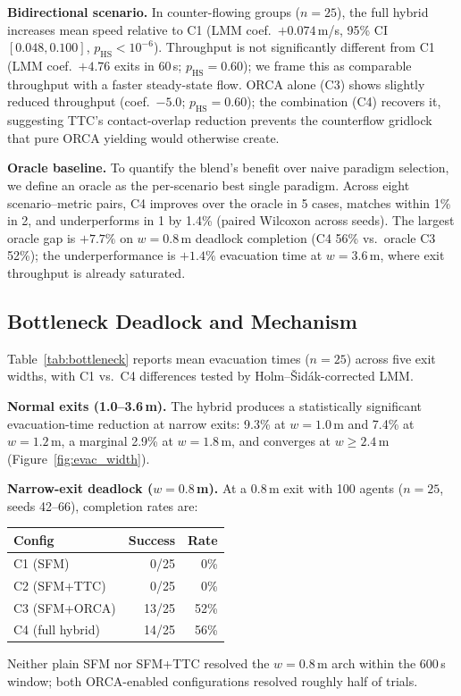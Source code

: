 \documentclass[a4paper,twoside]{article}
\begin{document}
\textbf{Bidirectional scenario.}
In counter-flowing groups ($n=25$), the full hybrid increases mean speed relative to C1 (LMM coef.\ $+0.074$\,m/s, 95\% CI $[0.048,0.100]$, $p_{\mathrm{HS}}<10^{-6}$). Throughput is not significantly different from C1 (LMM coef.\ $+4.76$ exits in 60\,s; $p_{\mathrm{HS}}=0.60$); we frame this as comparable throughput with a faster steady-state flow. ORCA alone (C3) shows slightly reduced throughput (coef.\ $-5.0$; $p_{\mathrm{HS}}=0.60$); the combination (C4) recovers it, suggesting TTC's contact-overlap reduction prevents the counterflow gridlock that pure ORCA yielding would otherwise create.

\textbf{Oracle baseline.}
To quantify the blend's benefit over naive paradigm selection, we define an oracle as the per-scenario best single paradigm. Across eight scenario--metric pairs, C4 improves over the oracle in 5 cases, matches within 1\% in 2, and underperforms in 1 by 1.4\% (paired Wilcoxon across seeds). The largest oracle gap is $+7.7\%$ on $w=0.8$\,m deadlock completion (C4 56\% vs.\ oracle C3 52\%); the underperformance is $+1.4\%$ evacuation time at $w=3.6$\,m, where exit throughput is already saturated.

\subsection{Bottleneck Deadlock and Mechanism}
\label{sec:bottleneck-evac}

Table~\ref{tab:bottleneck} reports mean evacuation times ($n=25$) across five exit widths, with C1 vs.\ C4 differences tested by Holm--\v{S}id\'ak-corrected LMM.

\textbf{Normal exits (1.0--3.6\,m).} The hybrid produces a statistically significant evacuation-time reduction at narrow exits: 9.3\% at $w=1.0$\,m and 7.4\% at $w=1.2$\,m, a marginal 2.9\% at $w=1.8$\,m, and converges at $w\ge 2.4$\,m (Figure~\ref{fig:evac_width}).

\textbf{Narrow-exit deadlock ($w=0.8$\,m).}
At a 0.8\,m exit with 100 agents ($n=25$, seeds 42--66), completion rates are:
\begin{center}\scriptsize
\begin{tabular}{@{}lrr@{}}
\toprule
\textbf{Config} & \textbf{Success} & \textbf{Rate} \\
\midrule
C1 (SFM)         & 0/25  & 0\% \\
C2 (SFM+TTC)     & 0/25  & 0\% \\
C3 (SFM+ORCA)    & 13/25 & 52\% \\
C4 (full hybrid) & 14/25 & 56\% \\
\bottomrule
\end{tabular}
\end{center}
Neither plain SFM nor SFM+TTC resolved the $w=0.8$\,m arch within the 600\,s window; both ORCA-enabled configurations resolved roughly half of trials.
\end{document}
